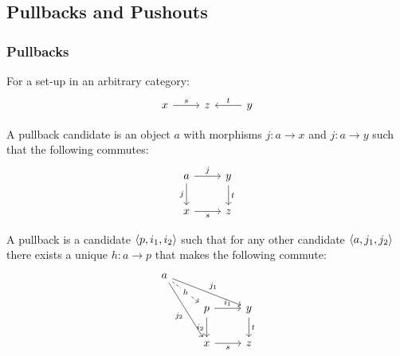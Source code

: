 \subsection{Pullbacks and Pushouts}

\subsubsection*{Pullbacks}

\begin{definition}
  For a set-up in an arbitrary category:
  \parencite{leinster:basic_category_theory}
  \[\begin{tikzcd}[ampersand replacement=\&]
    x \& z \& y
    \arrow["t"', from=1-3, to=1-2]
    \arrow["s", from=1-1, to=1-2]
  \end{tikzcd}\]

  A pullback candidate is an object $a$ with morphisms $j:a\to x$ and
  $j:a\to y$ such that the following commutes:
  \[\begin{tikzcd}[ampersand replacement=\&]
    a \& y \\
    x \& z
    \arrow["t", from=1-2, to=2-2]
    \arrow["s"', from=2-1, to=2-2]
    \arrow["j"', from=1-1, to=2-1]
    \arrow["j", from=1-1, to=1-2]
  \end{tikzcd}\]

  A pullback is a candidate $\langle p, i_1, i_2\rangle$ such that for any other candidate
  $\langle a, j_1, j_2\rangle$ there exists a unique $h:a\to p$ that makes the following
  commute:
  \[\begin{tikzcd}[ampersand replacement=\&]
    a \\
    \& p \& y \\
    \& x \& z
    \arrow["{i_2}"', from=2-2, to=3-2]
    \arrow["{i_1}", from=2-2, to=2-3]
    \arrow["t", from=2-3, to=3-3]
    \arrow["s"', from=3-2, to=3-3]
    \arrow["{j_2}"', from=1-1, to=3-2]
    \arrow["{j_1}", from=1-1, to=2-3]
    \arrow["h"{description}, dashed, from=1-1, to=2-2]
  \end{tikzcd}\]
\end{definition}

